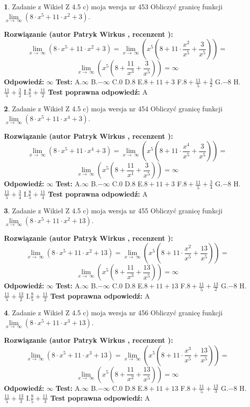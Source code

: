 \documentclass[12pt, a4paper]{article}
\theoremstyle{definition} %
\newtheorem{zad}{}
\newcommand{\zadStart}[1]{\begin{zad}#1\newline}
\newcommand{\zadStop}{\end{zad}}
\newcommand{\rozwStart}[2]{\noindent \textbf{Rozwiązanie (autor #1 , recenzent #2): }\newline}
\newcommand{\rozwStop}{\newline}
\newcommand{\odpStart}{\noindent \textbf{Odpowiedź:}\newline}
\newcommand{\odpStop}{\newline}
\newcommand{\testStart}{\noindent \textbf{Test:}\newline}
\newcommand{\testStop}{\newline}
\newcommand{\kluczStart}{\noindent \textbf{Test poprawna odpowiedź:}\newline}
\newcommand{\kluczStop}{\newline}
\begin{document}
\zadStart{Zadanie z Wikieł Z 4.5 c) moja wersja nr 453}
Obliczyć granicę funkcji  $\lim\limits_{x\to\ \infty}(8 \cdot x^{5}+11 \cdot x^{2}+3)$.
\zadStop
\rozwStart{Patryk Wirkus}{}
$$\lim\limits_{x\to\ \infty}(8 \cdot x^{5}+11 \cdot x^{2}+3) = \lim\limits_{x\to\ \infty}(x^{5}(8 +11 \cdot \frac{x^{2}}{x^{5}}+\frac{3}{x^{5}})) =$$ $$\lim\limits_{x\to\ \infty}(x^{5}(8 +\frac{11}{x^{3}}+\frac{3}{x^{5}})) =\infty$$
\rozwStop
\odpStart
$\infty$
\odpStop
\testStart
A.$\infty$ B.$-\infty$ C.$0$ D.$8$ E.$8 + 11 + 3$
F.$8+\frac{11}{5}+\frac{3}{2}$ G.$-8$
H.$\frac{11}{5}+\frac{3}{2}$
I.$\frac{8}{5}+\frac{11}{2}$
\testStop
\kluczStart
A
\kluczStop



\zadStart{Zadanie z Wikieł Z 4.5 c) moja wersja nr 454}
Obliczyć granicę funkcji  $\lim\limits_{x\to\ \infty}(8 \cdot x^{5}+11 \cdot x^{4}+3)$.
\zadStop
\rozwStart{Patryk Wirkus}{}
$$\lim\limits_{x\to\ \infty}(8 \cdot x^{5}+11 \cdot x^{4}+3) = \lim\limits_{x\to\ \infty}(x^{5}(8 +11 \cdot \frac{x^{4}}{x^{5}}+\frac{3}{x^{5}})) =$$ $$\lim\limits_{x\to\ \infty}(x^{5}(8 +\frac{11}{x^{1}}+\frac{3}{x^{5}})) =\infty$$
\rozwStop
\odpStart
$\infty$
\odpStop
\testStart
A.$\infty$ B.$-\infty$ C.$0$ D.$8$ E.$8 + 11 + 3$
F.$8+\frac{11}{5}+\frac{3}{4}$ G.$-8$
H.$\frac{11}{5}+\frac{3}{4}$
I.$\frac{8}{5}+\frac{11}{4}$
\testStop
\kluczStart
A
\kluczStop



\zadStart{Zadanie z Wikieł Z 4.5 c) moja wersja nr 455}
Obliczyć granicę funkcji  $\lim\limits_{x\to\ \infty}(8 \cdot x^{5}+11 \cdot x^{2}+13)$.
\zadStop
\rozwStart{Patryk Wirkus}{}
$$\lim\limits_{x\to\ \infty}(8 \cdot x^{5}+11 \cdot x^{2}+13) = \lim\limits_{x\to\ \infty}(x^{5}(8 +11 \cdot \frac{x^{2}}{x^{5}}+\frac{13}{x^{5}})) =$$ $$\lim\limits_{x\to\ \infty}(x^{5}(8 +\frac{11}{x^{3}}+\frac{13}{x^{5}})) =\infty$$
\rozwStop
\odpStart
$\infty$
\odpStop
\testStart
A.$\infty$ B.$-\infty$ C.$0$ D.$8$ E.$8 + 11 + 13$
F.$8+\frac{11}{5}+\frac{13}{2}$ G.$-8$
H.$\frac{11}{5}+\frac{13}{2}$
I.$\frac{8}{5}+\frac{11}{2}$
\testStop
\kluczStart
A
\kluczStop



\zadStart{Zadanie z Wikieł Z 4.5 c) moja wersja nr 456}
Obliczyć granicę funkcji  $\lim\limits_{x\to\ \infty}(8 \cdot x^{5}+11 \cdot x^{3}+13)$.
\zadStop
\rozwStart{Patryk Wirkus}{}
$$\lim\limits_{x\to\ \infty}(8 \cdot x^{5}+11 \cdot x^{3}+13) = \lim\limits_{x\to\ \infty}(x^{5}(8 +11 \cdot \frac{x^{3}}{x^{5}}+\frac{13}{x^{5}})) =$$ $$\lim\limits_{x\to\ \infty}(x^{5}(8 +\frac{11}{x^{2}}+\frac{13}{x^{5}})) =\infty$$
\rozwStop
\odpStart
$\infty$
\odpStop
\testStart
A.$\infty$ B.$-\infty$ C.$0$ D.$8$ E.$8 + 11 + 13$
F.$8+\frac{11}{5}+\frac{13}{3}$ G.$-8$
H.$\frac{11}{5}+\frac{13}{3}$
I.$\frac{8}{5}+\frac{11}{3}$
\testStop
\kluczStart
A
\kluczStop
\end{document}
